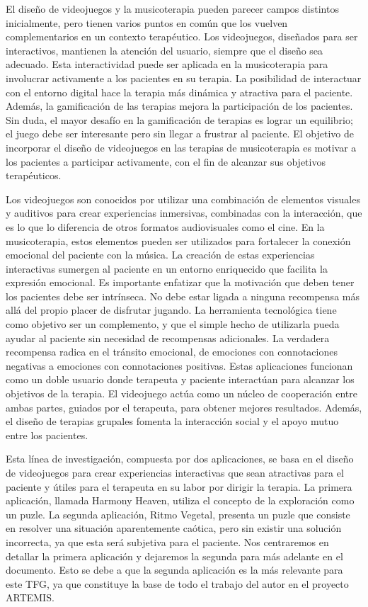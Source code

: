 El diseño de videojuegos y la musicoterapia pueden parecer campos distintos inicialmente, pero tienen varios puntos en común que los vuelven complementarios en un contexto terapéutico. Los videojuegos, diseñados para ser interactivos, mantienen la atención del usuario, siempre que el diseño sea adecuado. Esta interactividad puede ser aplicada en la musicoterapia para involucrar activamente a los pacientes en su terapia. La posibilidad de interactuar con el entorno digital hace la terapia más dinámica y atractiva para el paciente. Además, la gamificación de las terapias mejora la participación de los pacientes. Sin duda, el mayor desafío en la gamificación de terapias es lograr un equilibrio; el juego debe ser interesante pero sin llegar a frustrar al paciente. El objetivo de incorporar el diseño de videojuegos en las terapias de musicoterapia es motivar a los pacientes a participar activamente, con el fin de alcanzar sus objetivos terapéuticos.

Los videojuegos son conocidos por utilizar una combinación de elementos visuales y auditivos para crear experiencias inmersivas, combinadas con la interacción, que es lo que lo diferencia de otros formatos audiovisuales como el cine. En la musicoterapia, estos elementos pueden ser utilizados para fortalecer la conexión emocional del paciente con la música. La creación de estas experiencias interactivas sumergen al paciente en un entorno enriquecido que facilita la expresión emocional. Es importante enfatizar que la motivación que deben tener los pacientes debe ser intrínseca. No debe estar ligada a ninguna recompensa más allá del propio placer de disfrutar jugando. La herramienta tecnológica tiene como objetivo ser un complemento, y que el simple hecho de utilizarla pueda ayudar al paciente sin necesidad de recompensas adicionales. La verdadera recompensa radica en el tránsito emocional, de emociones con connotaciones negativas a emociones con connotaciones positivas. Estas aplicaciones funcionan como un doble usuario donde terapeuta y paciente interactúan para alcanzar los objetivos de la terapia. El videojuego actúa como un núcleo de cooperación entre ambas partes, guiados por el terapeuta, para obtener mejores resultados. Además, el diseño de terapias grupales fomenta la interacción social y el apoyo mutuo entre los pacientes. 

Esta línea de investigación, compuesta por dos aplicaciones, se basa en el diseño de videojuegos para crear experiencias interactivas que sean atractivas para el paciente y útiles para el terapeuta en su labor por dirigir la terapia. La primera aplicación, llamada Harmony Heaven, utiliza el concepto de la exploración como un puzle. La segunda aplicación, Ritmo Vegetal, presenta un puzle que consiste en resolver una situación aparentemente caótica, pero sin existir una solución incorrecta, ya que esta será subjetiva para el paciente. Nos centraremos en detallar la primera aplicación y dejaremos la segunda para más adelante en el documento. Esto se debe a que la segunda aplicación es la más relevante para este TFG, ya que constituye la base de todo el trabajo del autor en el proyecto ARTEMIS.

